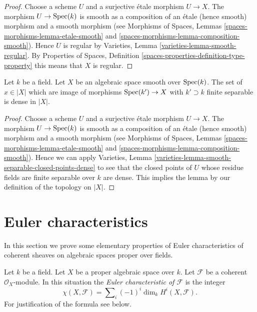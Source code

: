 \begin{proof}
Choose a scheme $U$ and a surjective \'etale morphism $U \to X$.
The morphism $U \to \mathop{\mathrm{Spec}}(k)$ is smooth as a composition of
an \'etale (hence smooth) morphism and a smooth morphism (see
Morphisms of Spaces, Lemmas \ref{spaces-morphisms-lemma-etale-smooth}
and \ref{spaces-morphisms-lemma-composition-smooth}).
Hence $U$ is regular by
Varieties, Lemma \ref{varieties-lemma-smooth-regular}.
By
Properties of Spaces, Definition
\ref{spaces-properties-definition-type-property}
this means that $X$ is regular.
\end{proof}

\begin{lemma}
\label{lemma-smooth-separable-closed-points-dense}
Let $k$ be a field. Let $X$ be an algebraic space smooth over $\mathop{\mathrm{Spec}}(k)$.
The set of $x \in |X|$ which are image of morphisms $\mathop{\mathrm{Spec}}(k') \to X$
with $k' \supset k$ finite separable is dense in $|X|$.
\end{lemma}

\begin{proof}
Choose a scheme $U$ and a surjective \'etale morphism $U \to X$.
The morphism $U \to \mathop{\mathrm{Spec}}(k)$ is smooth as a composition of
an \'etale (hence smooth) morphism and a smooth morphism (see
Morphisms of Spaces, Lemmas \ref{spaces-morphisms-lemma-etale-smooth}
and \ref{spaces-morphisms-lemma-composition-smooth}).
Hence we can apply Varieties, Lemma
\ref{varieties-lemma-smooth-separable-closed-points-dense} to see that
the closed points of $U$ whose residue fields are finite separable over
$k$ are dense. This implies the lemma by our definition of the
topology on $|X|$.
\end{proof}







\section{Euler characteristics}
\label{section-euler}

\noindent
In this section we prove some elementary properties of Euler characteristics
of coherent sheaves on algebraic spaces proper over fields.

\begin{definition}
\label{definition-euler-characteristic}
Let $k$ be a field. Let $X$ be a proper algebraic space over $k$.
Let $\mathcal{F}$
be a coherent $\mathcal{O}_X$-module. In this situation the
{\it Euler characteristic of $\mathcal{F}$} is the integer
$$
\chi(X, \mathcal{F}) = \sum\nolimits_i (-1)^i \dim_k H^i(X, \mathcal{F}).
$$
For justification of the formula see below.
\end{definition}


